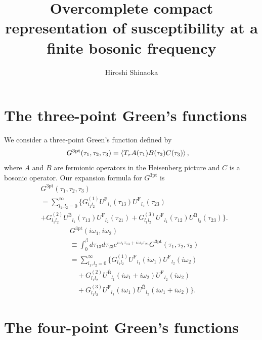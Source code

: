 \documentclass[prb,twocolumn,superscriptaddress]{revtex4-1}
\newcommand{\Gthree}{\ensuremath{G^\mathrm{3pt}}}
\newcommand{\UF}{\ensuremath{U^\mathrm{F}}}
\newcommand{\enhUB}{\ensuremath{U^\mathrm{\overline{B}}}}
\begin{document}
\title{Overcomplete compact representation of susceptibility at a finite bosonic frequency}
\author{Hiroshi Shinaoka}


\begin{abstract}
\end{abstract}


\maketitle
\section{The three-point Green's functions}
We consider a three-point Green's function defined by
\begin{align}
  \Gthree(\tau_1, \tau_2, \tau_3) &= \braket{T_\mathrm{\tau} A(\tau_1) B(\tau_2) C(\tau_3)},\label{eq:3point}
\end{align}
where $A$ and $B$ are fermionic operators in the Heisenberg picture and $C$ is a bosonic operator.
Our expansion formula for $\Gthree$ is
\begin{align}
	& \Gthree(\tau_1, \tau_2, \tau_3) \nonumber\\
	& =  \sum_{l_1,l_2=0}^\infty \Big\{G^{(1)}_{l_1l_2}\UF_{l_1}(\tau_{13})\UF_{l_2}(\tau_{23}) \nonumber\\
	& +  G_{l_1 l_2}^{(2)} \enhUB_{l_1}(\tau_{13})\UF_{l_2}(\tau_{21}) +
	G_{l_1 l_2}^{(3)} \UF_{l_1}(\tau_{12})\enhUB_{l_2}(\tau_{23})
	\Big\}.
\end{align}
\begin{align}
	&\Gthree(i\omega_1, i\omega_2)\nonumber\\
	&\equiv \int_0^\beta d\tau_{13} d\tau_{23} e^{i\omega_1 \tau_{13} + i \omega_2 \tau_{23}} \Gthree(\tau_1, \tau_2, \tau_3)
	\nonumber\\
	& =  \sum_{l_1,l_2=0}^\infty \Big\{G^{(1)}_{l_1l_2}\UF_{l_1}(i\omega_1)\UF_{l_2}(i\omega_2) \nonumber\\
	& \quad+  G_{l_1 l_2}^{(2)} \enhUB_{l_1}(i\omega_1 + i \omega_2)\UF_{l_2}(i \omega_2)
	\nonumber\\
	& \quad+
	G_{l_1 l_2}^{(3)} \UF_{l_1}(i\omega_1)\enhUB_{l_2}(i\omega_1 + i \omega_2)
	\Big\}.\label{eq:three-point-exp2}
\end{align}

\section{The four-point Green's functions}
\end{document}
